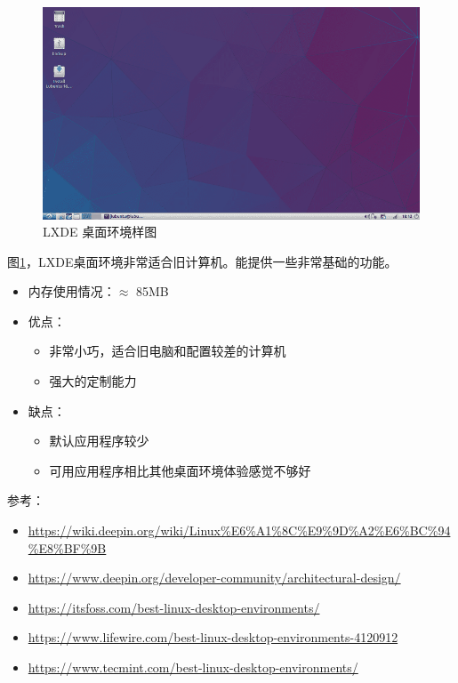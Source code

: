 \documentclass[doctor,openright,twoside]{sjtuthesis}
\providecommand{\tightlist}{%
    \setlength{\itemsep}{0pt}\setlength{\parskip}{0pt}}
\theoremstyle{plain}
\theoremstyle{definition}
\theoremstyle{remark}
\theoremstyle{ocrenumbox}
\theoremstyle{plain}
\begin{document}
\begin{figure}
\includegraphics{de-LXDE} \caption[LXDE 桌面环境样图]{LXDE 桌面环境样图}\label{fig:de-LXDE}
\end{figure}

图\ref{fig:de-LXDE}，LXDE桌面环境非常适合旧计算机。能提供一些非常基础的功能。

\begin{itemize}
\tightlist
\item
  内存使用情况：\(\approx\) 85MB
\item
  优点：

  \begin{itemize}
  \tightlist
  \item
    非常小巧，适合旧电脑和配置较差的计算机
  \item
    强大的定制能力
  \end{itemize}
\item
  缺点：

  \begin{itemize}
  \tightlist
  \item
    默认应用程序较少
  \item
    可用应用程序相比其他桌面环境体验感觉不够好
  \end{itemize}
\end{itemize}

参考：

\begin{itemize}
\tightlist
\item
  \url{https://wiki.deepin.org/wiki/Linux\%E6\%A1\%8C\%E9\%9D\%A2\%E6\%BC\%94\%E8\%BF\%9B}
\item
  \url{https://www.deepin.org/developer-community/architectural-design/}
\item
  \url{https://itsfoss.com/best-linux-desktop-environments/}
\item
  \url{https://www.lifewire.com/best-linux-desktop-environments-4120912}
\item
  \url{https://www.tecmint.com/best-linux-desktop-environments/}
\end{itemize}
\end{document}
